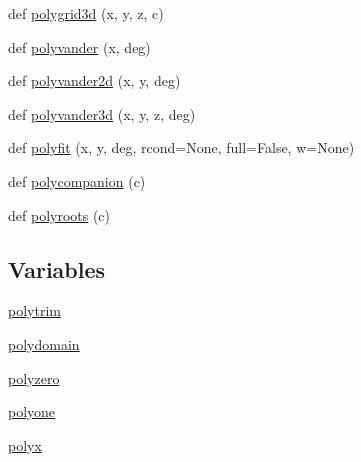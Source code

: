 \begin{DoxyCompactItemize}
def \hyperlink{namespacenumpy_1_1polynomial_1_1polynomial_ab35abbd26b79aafb0f8e104e5b5d3b6e}{polygrid3d} (x, y, z, c)
\item 
def \hyperlink{namespacenumpy_1_1polynomial_1_1polynomial_a3740343c509c52c3d018432609e48640}{polyvander} (x, deg)
\item 
def \hyperlink{namespacenumpy_1_1polynomial_1_1polynomial_a5be2e4cbb8f1f16a3eec0f1c72a8ef78}{polyvander2d} (x, y, deg)
\item 
def \hyperlink{namespacenumpy_1_1polynomial_1_1polynomial_a08a1fb8064d263c7468215308fd6f0d9}{polyvander3d} (x, y, z, deg)
\item 
def \hyperlink{namespacenumpy_1_1polynomial_1_1polynomial_a130d0c55e30505c68f062a2f7ce31c76}{polyfit} (x, y, deg, rcond=None, full=False, w=None)
\item 
def \hyperlink{namespacenumpy_1_1polynomial_1_1polynomial_a1a221c5711e3e7eb846da623d766e2be}{polycompanion} (c)
\item 
def \hyperlink{namespacenumpy_1_1polynomial_1_1polynomial_ae72aeba038985daa535ad28ac6c578b9}{polyroots} (c)
\end{DoxyCompactItemize}
\subsection*{Variables}
\begin{DoxyCompactItemize}
\item 
\hyperlink{namespacenumpy_1_1polynomial_1_1polynomial_a2de664e1f9c270594965d9743950e741}{polytrim}
\item 
\hyperlink{namespacenumpy_1_1polynomial_1_1polynomial_a7a119d1b65932bf329ae2b46feb15f91}{polydomain}
\item 
\hyperlink{namespacenumpy_1_1polynomial_1_1polynomial_aa3bf919463839420cc8515680877978f}{polyzero}
\item 
\hyperlink{namespacenumpy_1_1polynomial_1_1polynomial_a38838de0ae95dbf53f57e27bab6785a6}{polyone}
\item 
\hyperlink{namespacenumpy_1_1polynomial_1_1polynomial_a2471daff3218186409ae1bffea4d922d}{polyx}
\end{DoxyCompactItemize}


